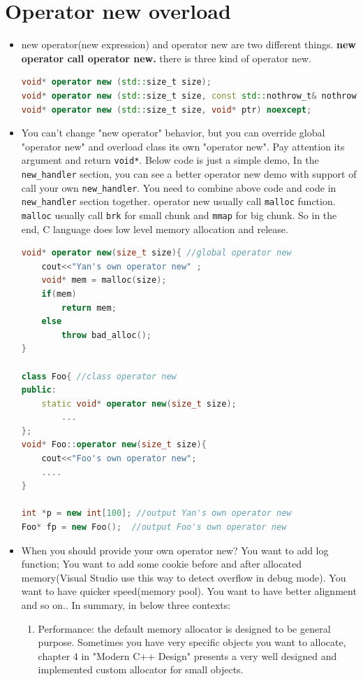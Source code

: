 \documentclass[a4paper,11pt,twoside]{book}
\begin{document}
\section{Operator new overload}
\begin{itemize}
	\item new operator(new expression) and operator new are two different things. \textbf{new operator call operator new.} there is three kind of operator new.
\begin{lstlisting}[frame=single, language=c++]
void* operator new (std::size_t size);
void* operator new (std::size_t size, const std::nothrow_t& nothrow_value) noexcept;
void* operator new (std::size_t size, void* ptr) noexcept;	
\end{lstlisting}	
	
	
	\item You can't change "new operator" behavior, but you can override global "operator new" and overload class its own "operator new". Pay attention its argument and return \texttt{void*}. Below code is just a simple demo, In the \texttt{new\_handler} section, you can see a better operator new demo with support of call your own \texttt{new\_handler}. You need to combine above code and code in \texttt{new\_handler} section together. operator new usually call \texttt{malloc} function. \texttt{malloc} usually call \texttt{brk} for small chunk and \texttt{mmap} for big chunk. So in the end, C language does low level memory allocation and release.
	
\begin{lstlisting}[frame=single, language=c++, mathescape=true]
void* operator new(size_t size){ //global operator new
	cout<<"Yan's own operator new" ;
	void* mem = malloc(size);
	if(mem)
		return mem;
	else
		throw bad_alloc();
}

class Foo{ //class operator new
public:
	static void* operator new(size_t size);
		...
};
void* Foo::operator new(size_t size){
	cout<<"Foo's own operator new";
	....
}
	
int *p = new int[100]; //output Yan's own operator new
Foo* fp = new Foo();  //output Foo's own operator new
\end{lstlisting}
	
	\item When you should provide your own operator new?  You want to add log function; You want to add some cookie before and after allocated memory(Visual Studio use this way to detect overflow in debug mode). You want to have quicker speed(memory pool). You want to have better alignment and so on.. In summary, in below three contexts:
	\begin{enumerate}
		\item Performance: the default memory allocator is designed to be general purpose. Sometimes you have very specific objects you want to allocate, chapter 4 in "Modern C++ Design" presents a very well designed and implemented custom allocator for small objects.
		

\end{enumerate}
\end{itemize}
\end{document}
